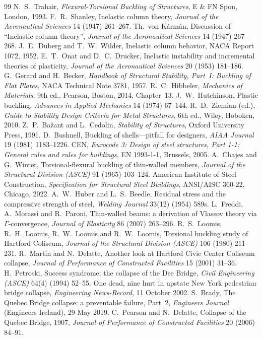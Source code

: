 \begin{chapterbib}{99}
 N.~S.~Trahair, \emph{Flexural-Torsional Buckling of Structures}, E \& FN Spon, London, 1993.
 F.~R.~Shanley, Inelastic column theory, \emph{Journal of the Aeronautical Sciences} 14 (1947) 261--267.
 Th.~von K\'arm\'an, Discussion of ``Inelastic column theory'', \emph{Journal of the Aeronautical Sciences} 14 (1947) 267--268.
 J.~E.~Duberg and T.~W.~Wilder, Inelastic column behavior, NACA Report 1072, 1952.
 E.~T.~Onat and D.~C.~Drucker, Inelastic instability and incremental theories of plasticity, \emph{Journal of the Aeronautical Sciences} 20 (1953) 181--186.
 G.~Gerard and H.~Becker, \emph{Handbook of Structural Stability, Part~I: Buckling of Flat Plates}, NACA Technical Note 3781, 1957.
 R.~C.~Hibbeler, \emph{Mechanics of Materials}, 9th ed., Pearson, Boston, 2014, Chapter~13.
 J.~W.~Hutchinson, Plastic buckling, \emph{Advances in Applied Mechanics} 14 (1974) 67--144.
 R.~D.~Ziemian (ed.), \emph{Guide to Stability Design Criteria for Metal Structures}, 6th ed., Wiley, Hoboken, 2010.
 Z.~P.~Ba\v{z}ant and L.~Cedolin, \emph{Stability of Structures}, Oxford University Press, 1991.
 D.~Bushnell, Buckling of shells---pitfall for designers, \emph{AIAA Journal} 19 (1981) 1183--1226.
 CEN, \emph{Eurocode 3: Design of steel structures, Part 1-1: General rules and rules for buildings}, EN 1993-1-1, Brussels, 2005.
 A.~Chajes and G.~Winter, Torsional-flexural buckling of thin-walled members, \emph{Journal of the Structural Division (ASCE)} 91 (1965) 103--124.
 American Institute of Steel Construction, \emph{Specification for Structural Steel Buildings}, ANSI/AISC 360-22, Chicago, 2022.
 A.~W.~Huber and L.~S.~Beedle, Residual stress and the compressive strength of steel, \emph{Welding Journal} 33(12) (1954) 589s.
 L.~Freddi, A.~Morassi and R.~Paroni, Thin-walled beams: a derivation of Vlassov theory via $\Gamma$-convergence, \emph{Journal of Elasticity} 86 (2007) 263--296.
 R.~S.~Loomis, R.~H.~Loomis, R.~W.~Loomis and R.~W.~Loomis, Torsional buckling study of Hartford Coliseum, \emph{Journal of the Structural Division (ASCE)} 106 (1980) 211--231.
 R.~Martin and N.~Delatte, Another look at Hartford Civic Center Coliseum collapse, \emph{Journal of Performance of Constructed Facilities} 15 (2001) 31--36.
 H.~Petroski, Success syndrome: the collapse of the Dee Bridge, \emph{Civil Engineering (ASCE)} 64(4) (1994) 52--55.
 One dead, nine hurt in upstate New York pedestrian bridge collapse, \emph{Engineering News-Record}, 11 October 2002.
 S.~Brady, The Quebec Bridge collapse: a preventable failure, Part~2, \emph{Engineers Journal} (Engineers Ireland), 29 May 2019.
 C.~Pearson and N.~Delatte, Collapse of the Quebec Bridge, 1907, \emph{Journal of Performance of Constructed Facilities} 20 (2006) 84--91.
\end{chapterbib}
